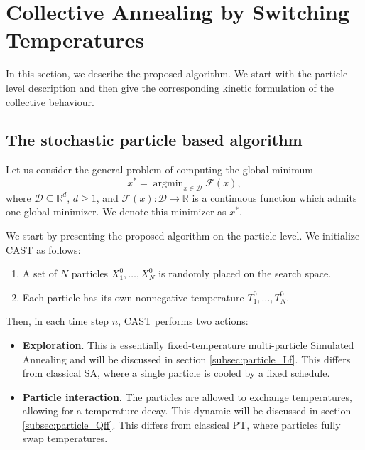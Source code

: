 \documentclass[10pt,a4paper]{article}
\theoremstyle{theorem}
\numberwithin{equation}{section}
\DeclareMathOperator*{\argmin}{argmin}
\begin{document}
\section{Collective Annealing by Switching Temperatures}
\label{sec:cast}
In this section, we describe the proposed algorithm. We start with the particle level description and then give the corresponding kinetic formulation of the collective behaviour.
\subsection{The stochastic particle based algorithm}
\label{sec:particle}
Let us consider the general problem of computing the global minimum
\begin{equation}
x^*=\argmin_{x\in\mathcal{D}}\mathcal{F}(x),
\end{equation}
where $\mathcal{D}\subseteq \mathbb{R}^d$, $d\geq 1$, and $\mathcal{F}(x):\mathcal{D}\rightarrow\mathbb{R}$ is a continuous function
which admits one
global minimizer. We denote
this minimizer as $x^*$.

We start by presenting the proposed algorithm on the particle level. We initialize CAST as follows: 
\begin{enumerate}
\item A set of $N$ particles $X_1^0,\ldots,X_N^0$ is randomly placed on the search space.
\item Each particle has its own {nonnegative} temperature $T_1^0,\ldots,T_N^0$.
\end{enumerate}
Then, in each time step $n$, CAST performs two actions:
\begin{itemize}
\item \textbf{Exploration}. This is essentially fixed-temperature multi-particle Simulated Annealing and will be discussed in section \ref{subsec:particle_Lf}. This differs from classical SA, where a single particle is cooled by a fixed schedule.
\item \textbf{Particle interaction}. The particles are allowed to exchange temperatures, allowing for a temperature decay. This dynamic will be discussed in section \ref{subsec:particle_Qff}. This differs from classical PT, where particles fully swap temperatures.
\end{itemize}
\end{document}
